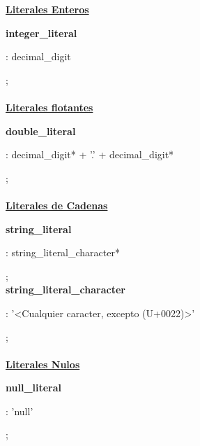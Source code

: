 \documentclass[12pt, letterpaper,spanish]{article}
\theoremstyle{definition}
\theoremstyle{remark}
\begin{document}
	\underline{\textbf{Literales Enteros}}\par
	\textbf{integer\_literal}\par
	: decimal\_digit\par
	; \\ \\
	
	\underline{\textbf{Literales flotantes}}\par
	\textbf{double\_literal}\par
	: decimal\_digit* + '.' + decimal\_digit*\par
	; \\ \\
	
	\underline{\textbf{Literales de Cadenas}}\par
	\textbf{string\_literal}\par
	: string\_literal\_character*\par
	; \\
	
	\textbf{string\_literal\_character}\par
	: '<Cualquier caracter, excepto (U+0022)>'\par
	; \\ \\
	
	\underline{\textbf{Literales Nulos}}\par
	\textbf{null\_literal}\par
	: 'null'\par
	; \\ \\
	
\end{document}
